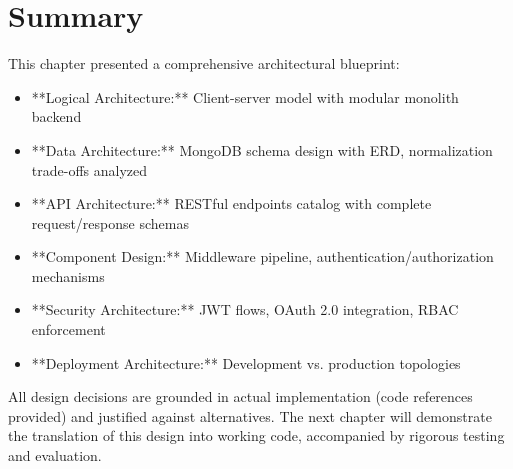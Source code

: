 \section{Summary}

This chapter presented a comprehensive architectural blueprint:

\begin{itemize}
    \item **Logical Architecture:** Client-server model with modular monolith backend
    \item **Data Architecture:** MongoDB schema design with ERD, normalization trade-offs analyzed
    \item **API Architecture:** RESTful endpoints catalog with complete request/response schemas
    \item **Component Design:** Middleware pipeline, authentication/authorization mechanisms
    \item **Security Architecture:** JWT flows, OAuth 2.0 integration, RBAC enforcement
    \item **Deployment Architecture:** Development vs. production topologies
\end{itemize}

All design decisions are grounded in actual implementation (code references provided) and justified against alternatives. The next chapter will demonstrate the translation of this design into working code, accompanied by rigorous testing and evaluation.

